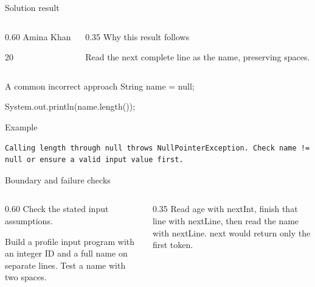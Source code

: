 \documentclass[10pt,aspectratio=169]{beamer}
\begin{document}
\begin{frame}[fragile,t]{Solution result}
\begin{columns}[T,onlytextwidth]\begin{column}{0.60\textwidth}
Amina Khan\par 20
\end{column}\begin{column}{0.35\textwidth}\small
Why this result follows

Read the next complete line as the name, preserving spaces.
\end{column}\end{columns}
\end{frame}

\begin{frame}[fragile,t]{A common incorrect approach}
String name = null;\par System.out.println(name.length());
\vspace{1mm}\begin{block}{Example}
\begin{lstlisting}
Calling length through null throws NullPointerException. Check name != null or ensure a valid input value first.
\end{lstlisting}
\end{block}
\end{frame}

\begin{frame}[fragile,t]{Boundary and failure checks}
\begin{columns}[T,onlytextwidth]\begin{column}{0.60\textwidth}
Check the stated input assumptions.

Build a profile input program with an integer ID and a full name on separate lines. Test a name with two spaces.
\end{column}\begin{column}{0.35\textwidth}\small
Read age with nextInt, finish that line with nextLine, then read the name with nextLine. next would return only the first token.
\end{column}\end{columns}
\end{frame}
\end{document}

